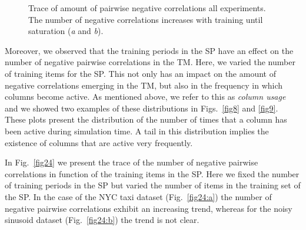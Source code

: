 \documentclass[11pt,letterpaper]{article}
\begin{document}
\begin{figure}[t]
{				    \label{fig23:c}
			    }
			    \caption{
			        Trace of amount of pairwise negative correlations all experiments.
			        The number of negative correlations increases with training until 
			        saturation (\emph{a} and \emph{b}).			        
			    }
			    \label{fig23}
		    \end{figure}
		    		    
		    Moreover, we observed that the training periods in the SP have
		    an effect on the number of negative pairwise correlations in the TM.
		    Here, we varied the number of training items for the SP.
		    This not only has an impact on the amount of negative correlations
		    emerging in the TM, but also in the frequency in which columns become
		    active.
		    As mentioned above, we refer to this as \emph{column usage} and 
		    we showed two examples of these distributions in Figs.~\ref{fig8} and \ref{fig9}.
		    These plots present the distribution of the number of times that a column
		    has been active during simulation time.
		    A tail in this distribution implies the existence of columns that are
		    active very frequently.
		    
		    In Fig.~\ref{fig24} we present the trace of the number of negative
		    pairwise correlations in function of the training items in the SP.
		    Here we fixed the number of training periods in the SP but varied the number
		    of items in the training set of the SP.
		    In the case of the NYC taxi dataset (Fig.~\ref{fig24:a}) the number of
		    negative pairwise correlations exhibit an increasing trend, whereas
		    for the noisy sinusoid dataset (Fig.~\ref{fig24:b}) the trend is not clear.
		    
\end{document}
